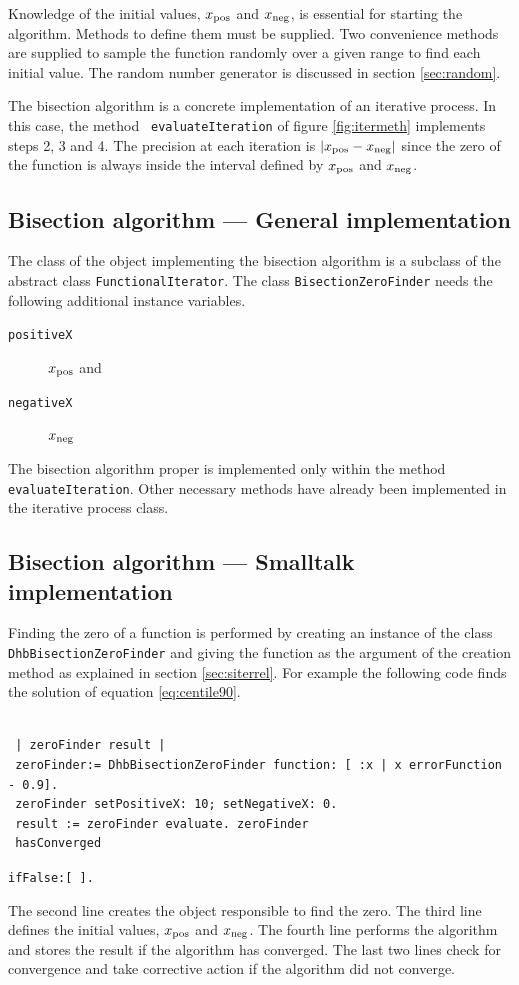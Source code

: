 \documentclass[twoside]{book}
\begin{document}
Knowledge of the initial values, $x_{\mathop{\rm pos}}$ and
$x_{\mathop{\rm neg}}$, is essential for starting the algorithm.
Methods to define them must be supplied. Two convenience methods
are supplied to sample the function randomly over a given range to
find each initial value. The random number generator is discussed
in section \ref{sec:random}.

The bisection algorithm is a concrete implementation of an
iterative process. In this case, the method {\tt
evaluateIteration} of figure \ref{fig:itermeth} implements steps
2, 3 and 4. The precision at each iteration is $\left|
x_{\mathop{\rm pos}}-x_{\mathop{\rm neg}}\right|$ since the zero
of the function is always inside the interval defined by
$x_{\mathop{\rm pos}}$ and $x_{\mathop{\rm neg}}$.

\subsection{Bisection algorithm --- General  implementation}

The class of the object implementing the bisection algorithm is a
subclass of the abstract class {\tt FunctionalIterator}. The class
{\tt BisectionZeroFinder} needs the following additional instance
variables.
\begin{description}
  \item[\tt positiveX]$x_{\mathop{\rm pos}}$ and
  \item [\tt negativeX]$x_{\mathop{\rm neg}}$
\end{description}
The bisection algorithm proper is implemented only within the
method {\tt evaluateIteration}. Other necessary methods have
already been implemented in the iterative process class.

\subsection{Bisection algorithm --- Smalltalk  implementation}
Finding the zero of a function is performed by creating an
instance of the class {\tt DhbBisectionZeroFinder} and giving the
function as the argument of the creation method as explained in
section \ref{sec:siterrel}. For example the following code finds
the solution of equation \ref{eq:centile90}.
\begin{codeExample}
\begin{verbatim}

 | zeroFinder result |
 zeroFinder:= DhbBisectionZeroFinder function: [ :x | x errorFunction - 0.9].
 zeroFinder setPositiveX: 10; setNegativeX: 0.
 result := zeroFinder evaluate. zeroFinder
 hasConverged
\end{verbatim}
    {\tt\hspace{4 em}ifFalse:[ {\sl <special case processing>}].}
\end{codeExample}
The second line creates the object responsible to find the zero.
The third line defines the initial values, $x_{\mathop{\rm pos}}$
and $x_{\mathop{\rm neg}}$. The fourth line performs the algorithm
and stores the result if the algorithm has converged. The last two
lines check for convergence and take corrective action if the
algorithm did not converge.
\end{document}
